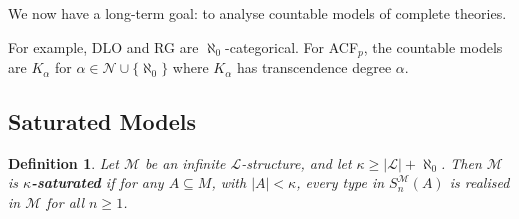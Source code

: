 \documentclass[]{article}
\theoremstyle{custhm}
\theoremstyle{cusdef}
\newtheorem{defin}[theorem]{Definition}
\theoremstyle{custhm}
\theoremstyle{custhm}
\theoremstyle{custhm}
\theoremstyle{ex}
\theoremstyle{custhm}
\theoremstyle{cusdef}
\theoremstyle{remark}
\theoremstyle{remark}
\newcommand{\undf}[1]{\textit{\textbf{#1}}}
\renewcommand{\L}{\mathcal{L}}
\newcommand{\M}{\mathcal{M}}
\newcommand{\N}{\mathcal{N}}
\newcommand{\sman}{S_n^\M(A)}
\renewcommand{\subset}{\subseteq}
\begin{document}
We now have a long-term goal: to analyse countable models of complete theories.

For example, DLO and RG are $\aleph_0$-categorical. For ACF$_p$, the countable models are $K_\alpha$ for $\alpha \in \N\cup\{\aleph_0\}$ where $K_\alpha$ has transcendence degree $\alpha$.

\subsection*{Saturated Models}

\begin{defin}
Let $\M$ be an infinite $\L$-structure, and let $\kappa \ge |\L| + \aleph_0$. Then $\M$ is \undf{$\kappa$-saturated} if for any $A\subset M$, with $|A| < \kappa$, every type in $\sman$ is realised in $\M$ for all $n\ge 1$.
\end{defin}
\end{document}
